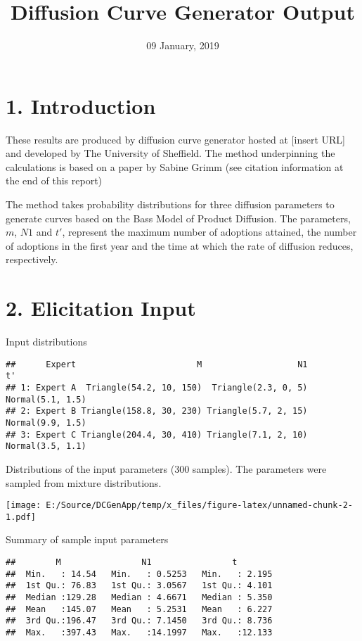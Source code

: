 \documentclass[]{article}
\title{Diffusion Curve Generator Output}
\author{}
\date{09 January, 2019}
\begin{document}
\maketitle

\section{1. Introduction}\label{introduction}

These results are produced by diffusion curve generator hosted at
{[}insert URL{]} and developed by The University of Sheffield. The
method underpinning the calculations is based on a paper by Sabine Grimm
(see citation information at the end of this report)

The method takes probability distributions for three diffusion
parameters to generate curves based on the Bass Model of Product
Diffusion. The parameters, \(m\), \(N1\) and \(t'\), represent the
maximum number of adoptions attained, the number of adoptions in the
first year and the time at which the rate of diffusion reduces,
respectively.

\pagebreak

\section{2. Elicitation Input}\label{elicitation-input}

Input distributions

\begin{verbatim}
##      Expert                        M                   N1               t'
## 1: Expert A  Triangle(54.2, 10, 150)  Triangle(2.3, 0, 5) Normal(5.1, 1.5)
## 2: Expert B Triangle(158.8, 30, 230) Triangle(5.7, 2, 15) Normal(9.9, 1.5)
## 3: Expert C Triangle(204.4, 30, 410) Triangle(7.1, 2, 10) Normal(3.5, 1.1)
\end{verbatim}

Distributions of the input parameters (300 samples). The parameters were
sampled from mixture distributions.

\texttt{[image: E:/Source/DCGenApp/temp/x\_files/figure-latex/unnamed-chunk-2-1.pdf]}

Summary of sample input parameters

\begin{verbatim}
##        M                N1                t         
##  Min.   : 14.54   Min.   : 0.5253   Min.   : 2.195  
##  1st Qu.: 76.83   1st Qu.: 3.0567   1st Qu.: 4.101  
##  Median :129.28   Median : 4.6671   Median : 5.350  
##  Mean   :145.07   Mean   : 5.2531   Mean   : 6.227  
##  3rd Qu.:196.47   3rd Qu.: 7.1450   3rd Qu.: 8.736  
##  Max.   :397.43   Max.   :14.1997   Max.   :12.133
\end{verbatim}
\end{document}
